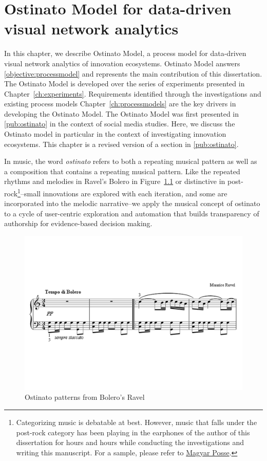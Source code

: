 \chapter{Ostinato Model for data-driven visual network analytics}
\label{ch:ostinato}

In this chapter, we describe Ostinato Model, a process model for data-driven visual network analytics of innovation ecosystems. Ostinato Model answers \ref{objective:processmodel} and represents the main contribution of this dissertation. The Ostinato Model is developed over the series of experiments presented in Chapter~\ref{ch:experiments}. Requirements identified through the investigations and existing process models Chapter~\ref{ch:processmodels} are the key drivers in developing the Ostinato Model.  The Ostinato Model was first presented in \ref{pub:ostinato} in the context of social media studies. Here, we discuss the Ostinato model in particular in the context of investigating innovation ecosystems. This chapter is a revised version of a section in \ref{pub:ostinato}.

In music, the word \emph{ostinato} refers to both a repeating musical pattern as well as a composition that contains a repeating musical pattern. Like the repeated rhythms and melodies in Ravel's Bolero in Figure~\ref{fig:bolero-ostinato} or distinctive in post-rock\footnote{Categorizing music is  debatable at best. However, music that falls under the post-rock category has been playing in the earphones of the author of this dissertation for hours and hours while conducting the investigations and writing this manuscript. For a sample, please refer to \href{https://www.youtube.com/watch?v=fD2HgZMdxOI}{Magyar Posse}.}--small innovations are explored with each iteration, and some are incorporated into the melodic narrative--we apply the musical concept of ostinato to a cycle of user-centric exploration and automation that builds transparency of authorship for evidence-based decision making.

\begin{figure}[htb]
\centering
\includegraphics[width=12cm]{figure/Bolero.pdf}
\caption{Ostinato patterns from Bolero's Ravel \citep{Mawer2000TheRavel}}
\label{fig:bolero-ostinato}
\end{figure}

